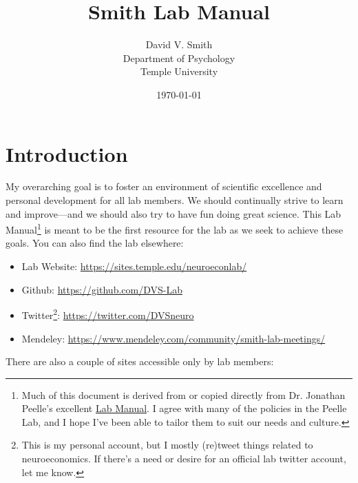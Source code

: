 \documentclass[letterpaper,12pt,oneside]{memoir}
\begin{document}
\title{Smith Lab Manual}
\author{David V. Smith\\Department of Psychology\\Temple University}
\date{\today}


\maketitle

\pagestyle{titlingpage}


\cleardoublepage
\frontmatter
\tableofcontents
\cleardoublepage

\mainmatter

\pagestyle{headings}

\chapter{Introduction}

My overarching goal is to foster an environment of scientific excellence and personal development for all lab members. We should continually strive to learn and improve---and we should also try to have fun doing great science. This Lab Manual\footnote{Much of this document is derived from or copied directly from Dr. Jonathan Peelle's excellent \href{https://github.com/jpeelle/peellelab\_manual/}{Lab Manual}. I agree with many of the policies in the Peelle Lab, and I hope I've been able to tailor them to suit our needs and culture.} is meant to be the first resource for the lab as we seek to achieve these goals. You can also find the lab elsewhere:

\begin{itemize}
\item Lab Website: \url{https://sites.temple.edu/neuroeconlab/}
\item Github: \url{https://github.com/DVS-Lab}
\item Twitter\footnote{This is my personal account, but I mostly (re)tweet things related to neuroeconomics. If there's a need or desire for an official lab twitter account, let me know.}: \url{https://twitter.com/DVSneuro}
\item Mendeley: \url{https://www.mendeley.com/community/smith-lab-meetings/}
\end{itemize}

\noindent There are also a couple of sites accessible only by lab members:
\end{document}
